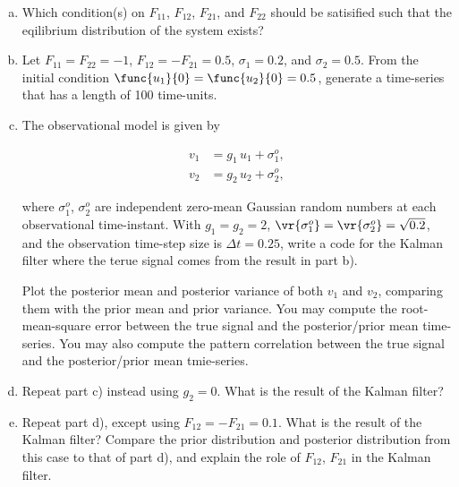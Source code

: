 \begin{enumerate}[a)]
	\item Which condition(s) on $F_{11}$, $F_{12}$, $F_{21}$, and $F_{22}$ should be satisified such that the eqilibrium distribution of the system exists?
	
	\item Let $F_{11} = F_{22} = -1$, $F_{12} = -F_{21} = 0.5$, $\sigma_1 = 0.2$, and $\sigma_2 = 0.5$. From the initial condition $\func{u_1}{0} = \func{u_2}{0} = 0.5$, generate a time-series that has a length of 100 time-units.
	
	\item The observational model is given by
	
	\begin{subequations}
		\begin{align}
			v_1 &= g_1\,u_1 + \sigma_1^{o}, \\
			v_2 &= g_2\,u_2 + \sigma_2^{o},
		\end{align}
	\end{subequations}
	
	where $\sigma_1^{o}$, $\sigma_2^{o}$ are independent zero-mean Gaussian random numbers at each observational time-instant. With $g_1 = g_2 = 2$, $\vr{\sigma_1^{o}} = \vr{\sigma_2^{o}} = \sqrt{0.2}$, and the observation time-step size is $\Delta t = 0.25$, write a code for the Kalman filter where the terue signal comes from the result in part b).
	
	Plot the posterior mean and posterior variance of both $v_1$ and $v_2$, comparing them with the prior mean and prior variance. You may compute the root-mean-square error between the true signal and the posterior/prior mean time-series. You may also compute the pattern correlation between the true signal and the posterior/prior mean tmie-series.
	
	\item Repeat part c) instead using $g_2 = 0$. What is the result of the Kalman filter?
	
	\item Repeat part d), except using $F_{12} = -F_{21} = 0.1$. What is the result of the Kalman filter? Compare the prior distribution and posterior distribution from this case to that of part d), and explain the role of $F_{12}$, $F_{21}$ in the Kalman filter.
\end{enumerate}

